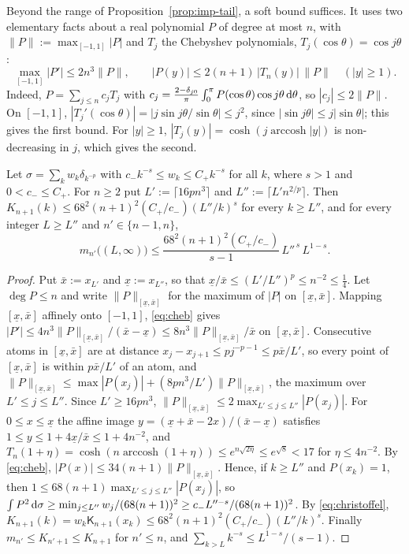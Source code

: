 Beyond the range of Proposition~\ref{prop:imp-tail}, a soft bound suffices. It uses two elementary facts about a
real polynomial $P$ of degree at most $n$, with $\|P\|:=\max_{[-1,1]}|P|$ and $T_j$ the Chebyshev polynomials,
$T_j(\cos\theta)=\cos j\theta$:
\begin{equation}\label{eq:cheb}
  \max_{[-1,1]}|P'|\le2n^3\|P\|,\qquad |P(y)|\le2(n+1)\,|T_n(y)|\,\|P\|\quad(|y|\ge1).
\end{equation}
Indeed, $P=\sum_{j\le n}c_jT_j$ with $c_j=\frac{2-\delta_{j0}}\pi\int_0^\pi P(\cos\theta)\cos j\theta\,\mathrm{d}\theta$, so
$|c_j|\le2\|P\|$. On $[-1,1]$, $|T_j'(\cos\theta)|=|j\sin j\theta/\sin\theta|\le j^2$, since $|\sin j\theta|\le j|\sin\theta|$; this
gives the first bound. For $|y|\ge1$, $|T_j(y)|=\cosh(j\operatorname{arccosh}|y|)$ is non-decreasing in $j$, which gives
the second.

\begin{lemma}\label{lem:TL}
Let $\sigma=\sum_kw_k\delta_{k^{-p}}$ with $c_-k^{-s}\le w_k\le C_+k^{-s}$ for all $k$, where $s>1$ and $0<c_-\le C_+$. For
$n\ge2$ put $L':=\lceil16pn^3\rceil$ and $L'':=\lceil L'n^{2/p}\rceil$. Then $K_{n+1}(k)\le68^2(n+1)^2(C_+/c_-)(L''/k)^s$ for
every $k\ge L''$, and for every integer $L\ge L''$ and $n'\in\{n-1,n\}$,
\[
  m_{n'}\bigl((L,\infty)\bigr)\le\frac{68^2(n+1)^2(C_+/c_-)}{s-1}\,L''^{\,s}\,L^{1-s}.
\]
\end{lemma}

\begin{proof}
Put $\bar x:=x_{L'}$ and $\underline x:=x_{L''}$, so that $\underline x/\bar x\le(L'/L'')^p\le n^{-2}\le\frac14$. Let $\deg P\le n$ and write $\|P\|_{[\underline x,\bar x]}$
for the maximum of $|P|$ on $[\underline x,\bar x]$. Mapping $[\underline x,\bar x]$ affinely onto $[-1,1]$, \eqref{eq:cheb} gives $|P'|\le
4n^3\|P\|_{[\underline x,\bar x]}/(\bar x-\underline x)\le8n^3\|P\|_{[\underline x,\bar x]}/\bar x$ on $[\underline x,\bar x]$. Consecutive atoms in $[\underline x,\bar x]$ are at distance $x_j-x_{j+1}\le
pj^{-p-1}\le p\bar x/L'$, so every point of $[\underline x,\bar x]$ is within $p\bar x/L'$ of an atom, and
$\|P\|_{[\underline x,\bar x]}\le\max|P(x_j)|+(8pn^3/L')\|P\|_{[\underline x,\bar x]}$, the maximum over $L'\le j\le L''$. Since $L'\ge16pn^3$,
$\|P\|_{[\underline x,\bar x]}\le2\max_{L'\le j\le L''}|P(x_j)|$. For $0\le x\le\underline x$ the affine image $y=(\underline x+\bar x-2x)/(\bar x-\underline x)$ satisfies
$1\le y\le1+4\underline x/\bar x\le1+4n^{-2}$, and $T_n(1+\eta)=\cosh(n\operatorname{arccosh}(1+\eta))\le e^{n\sqrt{2\eta}}\le e^{\sqrt8}<17$ for
$\eta\le4n^{-2}$. By \eqref{eq:cheb}, $|P(x)|\le34(n+1)\|P\|_{[\underline x,\bar x]}$. Hence, if $k\ge L''$ and $P(x_k)=1$, then
$1\le68(n+1)\max_{L'\le j\le L''}|P(x_j)|$, so $\int P^2\,\mathrm{d}\sigma\ge\min_{j\le L''}w_j/(68(n+1))^2\ge c_-L''^{-s}/(68(n+1))^2$.
By \eqref{eq:christoffel}, $K_{n+1}(k)=w_k\mathsf K_{n+1}(x_k)\le68^2(n+1)^2(C_+/c_-)(L''/k)^s$. Finally
$m_{n'}\le K_{n'+1}\le K_{n+1}$ for $n'\le n$, and $\sum_{k>L}k^{-s}\le L^{1-s}/(s-1)$.
\end{proof}

